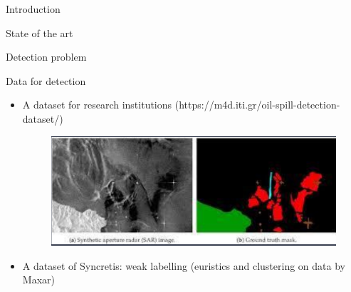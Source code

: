 \documentclass{beamer}
\begin{document}
\begin{section}{Introduction}
\begin{frame}{State of the art}
\end{frame}

\end{section}

\begin{section}{Detection problem}
	\begin{frame}{Data for detection}
	\begin{itemize}
		\item A dataset for research institutions (https://m4d.iti.gr/oil-spill-detection-dataset/)
		
		\begin{figure}[H]
			\centering
			\includegraphics[scale=0.2]{greek_dataset_example.png}
		\end{figure}
		
		\item A dataset of Syncretis: weak labelling (euristics and clustering on data by Maxar)
		

\end{itemize}
\end{frame}
\end{section}
\end{document}
